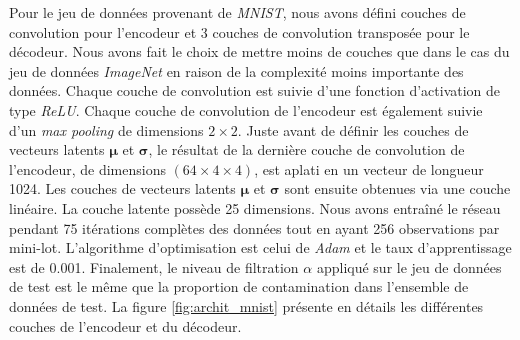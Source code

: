Pour le jeu de données provenant de \textit{MNIST}, nous avons défini \DIFdelbegin {}\DIFdelend \DIFaddbegin {}\DIFaddend couches de convolution pour l'encodeur et 3 couches de convolution transposée pour le décodeur. Nous avons fait le choix de mettre moins de couches que dans le cas du jeu de données \textit{ImageNet} en raison de la complexité moins importante des données.  Chaque couche de convolution est suivie d'une fonction d'activation de type \textit{ReLU}. Chaque couche de convolution de l'encodeur est également suivie d'un \textit{max pooling} de dimensions $2 \times 2$. Juste avant de définir les couches de vecteurs latents $\boldsymbol{\mu}$ et $\boldsymbol{\sigma}$, le résultat de la dernière couche de convolution de l'encodeur, de dimensions $(64 \times 4 \times 4)$, est aplati en un vecteur  de longueur 1024. Les couches de vecteurs latents $\boldsymbol{\mu}$ et $\boldsymbol{\sigma}$ sont ensuite obtenues via une couche linéaire. La couche latente possède 25 dimensions. Nous avons entraîné le réseau pendant 75 itérations complètes des données tout en ayant 256 observations par mini-lot. L'algorithme d'optimisation est celui de \textit{Adam} et le taux d'apprentissage est de 0.001. Finalement, le niveau de filtration $\alpha$ appliqué sur le jeu de données de test est le même que la proportion de contamination dans l'ensemble de données de test. La figure \ref{fig:archit_mnist} présente en détails les différentes couches de l'encodeur et du décodeur.

